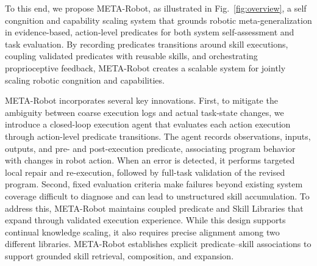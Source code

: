 \documentclass{article} %
\newcommand{\rev}[1]{\textcolor{red}{#1}}
\begin{document}
To this end, we propose META-Robot, as illustrated in Fig.~\ref{fig:overview}, a self  congnition and capability scaling system that grounds robotic meta-generalization in evidence-based, action-level predicates for both system self-assessment and task evaluation. By recording predicates transitions around skill executions, coupling validated predicates with reusable skills, and orchestrating proprioceptive feedback, META-Robot creates a scalable system for jointly scaling  robotic congnition and capabilities.

META-Robot incorporates several key innovations. First, to mitigate the ambiguity between coarse execution logs and actual task-state changes, we introduce a closed-loop execution agent that evaluates each action execution through action-level predicate transitions. The agent records observations, inputs, outputs, and pre- and post-execution predicate, associating program behavior with changes in robot action. When an error is detected, it performs targeted local repair and re-execution, followed by full-task validation of the revised program. Second, fixed evaluation criteria make failures beyond existing system coverage difficult to diagnose and can lead to unstructured skill accumulation. To address this, META-Robot maintains coupled predicate and Skill Libraries that expand through validated execution experience. While this design supports continual knowledge scaling, it also requires precise alignment among two different libraries. META-Robot establishes explicit predicate--skill associations to support grounded skill retrieval, composition, and expansion.
\end{document}
